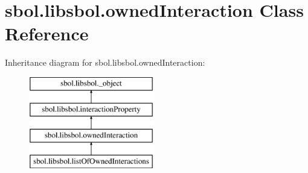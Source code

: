 \hypertarget{classsbol_1_1libsbol_1_1owned_interaction}{}\section{sbol.\+libsbol.\+owned\+Interaction Class Reference}
\label{classsbol_1_1libsbol_1_1owned_interaction}
Inheritance diagram for sbol.\+libsbol.\+owned\+Interaction\+:\begin{figure}[H]
\begin{center}
\leavevmode
\includegraphics[height=4.000000cm]{classsbol_1_1libsbol_1_1owned_interaction}
\end{center}
\end{figure}
